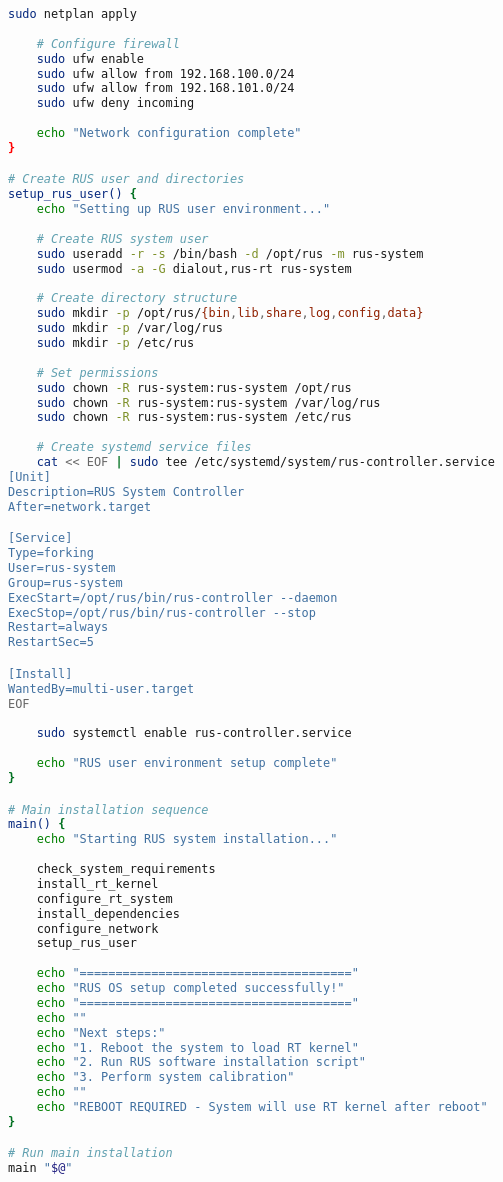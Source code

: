 \begin{lstlisting}[language=bash, caption={Operating System Installation Script}, label={lst:app-os-setup}]
    sudo netplan apply
    
    # Configure firewall
    sudo ufw enable
    sudo ufw allow from 192.168.100.0/24
    sudo ufw allow from 192.168.101.0/24
    sudo ufw deny incoming
    
    echo "Network configuration complete"
}

# Create RUS user and directories
setup_rus_user() {
    echo "Setting up RUS user environment..."
    
    # Create RUS system user
    sudo useradd -r -s /bin/bash -d /opt/rus -m rus-system
    sudo usermod -a -G dialout,rus-rt rus-system
    
    # Create directory structure
    sudo mkdir -p /opt/rus/{bin,lib,share,log,config,data}
    sudo mkdir -p /var/log/rus
    sudo mkdir -p /etc/rus
    
    # Set permissions
    sudo chown -R rus-system:rus-system /opt/rus
    sudo chown -R rus-system:rus-system /var/log/rus
    sudo chown -R rus-system:rus-system /etc/rus
    
    # Create systemd service files
    cat << EOF | sudo tee /etc/systemd/system/rus-controller.service
[Unit]
Description=RUS System Controller
After=network.target

[Service]
Type=forking
User=rus-system
Group=rus-system
ExecStart=/opt/rus/bin/rus-controller --daemon
ExecStop=/opt/rus/bin/rus-controller --stop
Restart=always
RestartSec=5

[Install]
WantedBy=multi-user.target
EOF
    
    sudo systemctl enable rus-controller.service
    
    echo "RUS user environment setup complete"
}

# Main installation sequence
main() {
    echo "Starting RUS system installation..."
    
    check_system_requirements
    install_rt_kernel
    configure_rt_system
    install_dependencies
    configure_network
    setup_rus_user
    
    echo "======================================"
    echo "RUS OS setup completed successfully!"
    echo "======================================"
    echo ""
    echo "Next steps:"
    echo "1. Reboot the system to load RT kernel"
    echo "2. Run RUS software installation script"
    echo "3. Perform system calibration"
    echo ""
    echo "REBOOT REQUIRED - System will use RT kernel after reboot"
}

# Run main installation
main "$@"
\end{lstlisting}

